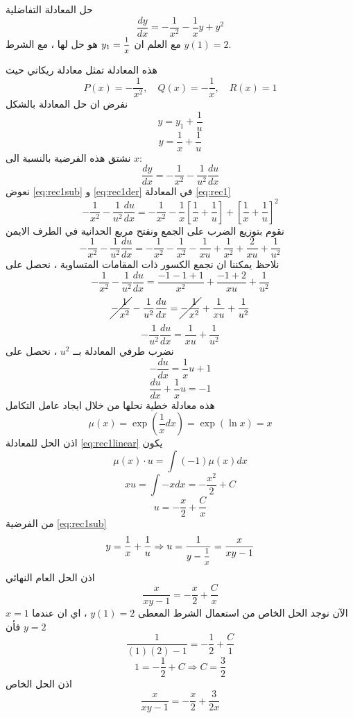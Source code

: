 \setcounter{example}{0}
\setcounter{equation}{0}

\newpage
\begin{example}
	حل المعادلة التفاضلية
	\begin{equation}
		\label{eq:rec1}
		\frac{dy}{dx} = -\frac{1}{x^2} - \frac{1}{x} y + y^2
	\end{equation}
	مع العلم ان 
	$y_1=\mfrac{1}{x}$ هو حل لها ، مع الشرط $y(1) = 2 $.
\end{example}
\begin{solution}
	هذه المعادلة تمثل معادلة ريكاتي حيث
	\[
	P(x) = -\frac{1}{x^2}, \quad Q(x) =-\frac{1}{x} , \quad R(x) = 1 
	\]
	نفرض ان حل المعادلة بالشكل
	\[
	y = y_1 + \frac{1}{u}
	\]
	\begin{equation}
		\label{eq:rec1sub}
		y = \frac{1}{x} + \frac{1}{u}
	\end{equation}
	نشتق هذه الفرضية بالنسبة الى $x$:
	\begin{equation}
		\label{eq:rec1der}
		\frac{dy}{dx} = -\frac{1}{x^2} - \frac{1}{u^2}\frac{du}{dx}
	\end{equation}
	نعوض 
	\eqref{eq:rec1sub} و \eqref{eq:rec1der} في المعادلة \eqref{eq:rec1}
	\[
	-\frac{1}{x^2} - \frac{1}{u^2}\frac{du}{dx} = -\frac{1}{x^2} - \frac{1}{x} \left[\frac{1}{x} + \frac{1}{u}\right] + \left[\frac{1}{x} + \frac{1}{u}\right]^2
	\]
	نقوم بتوزيع الضرب على الجمع ونفتح مربع الحدانية في الطرف الايمن
	\[
	-\frac{1}{x^2} - \frac{1}{u^2}\frac{du}{dx}=
	-\frac{1}{x^2}-\frac{1}{x^2} -\frac{1}{xu} + \frac{1}{x^2} + \frac{2}{xu} + \frac{1}{u^2}
	\]
	نلاحظ يمكننا ان نجمع الكسور ذات المقامات المتساوية ، نحصل على 
	\[
	-\frac{1}{x^2} - \frac{1}{u^2}\frac{du}{dx}=
	\frac{-1-1+1}{x^2} + \frac{-1+2}{xu} + \frac{1}{u^2} 
	\]
	\[
	\cancel{-\frac{1}{x^2}} - \frac{1}{u^2}\frac{du}{dx}=
	\cancel{-\frac{1}{x^2}} + \frac{1}{xu} + \frac{1}{u^2}
	\]
	\[
	-\frac{1}{u^2}\frac{du}{dx} = \frac{1}{xu} + \frac{1}{u^2}
	\]
	نضرب طرفي المعادلة بــ  $u^2 $ ، نحصل على 
	\[
	-\frac{du}{dx} = \frac{1}{x} u + 1
	\]
	\begin{equation}
		\label{eq:rec1linear}
		\frac{du}{dx} + \frac{1}{x} u = -1
	\end{equation}
	هذه معادلة خطية نحلها من خلال ايجاد عامل التكامل
	\[
	\mu(x) = \exp\left(\frac{1}{x} dx\right) = \exp(\ln x) =x
	\]
	اذن الحل للمعادلة \eqref{eq:rec1linear} يكون 
	\[
	\mu(x)\cdot u = \int (-1) \mu(x) dx
	\]
	\[
	xu = \int -x dx = -\frac{x^2}{2} + C
	\]
	\[
	u = -\frac{x}{2} + \frac{C}{x}
	\]
	من الفرضية \eqref{eq:rec1sub} 
	\[
	y = \frac{1}{x} + \frac{1}{u} \Rightarrow u = \frac{1}{y-\mfrac{1}{x}} = \frac{x}{xy-1}
	\]
	اذن الحل العام النهائي
	\[
	\frac{x}{xy-1} = -\frac{x}{2} + \frac{C}{x}
	\]
	الآن نوجد الحل الخاص من استعمال الشرط المعطى 
	$y(1)=2$ ، اي ان عندما $x=1$ فأن $y=2$
	\[
	\frac{1}{(1)(2)-1} = -\frac{1}{2} + \frac{C}{1}
	\]
	\[
	1 = -\frac{1}{2} + C \Rightarrow C = \frac{3}{2}
	\]
	اذن الحل الخاص 
	\[
	\frac{x}{xy-1} = -\frac{x}{2} + \frac{3}{2x}
	\]
\end{solution}

